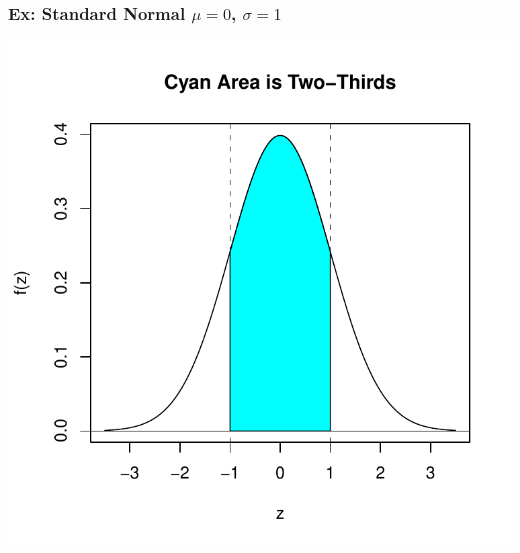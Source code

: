 \documentclass[handout]{beamer}
\begin{document}
\begin{frame}
\frametitle{Ex: Standard Normal $\mu=0$, $\sigma=1$}
\begin{center}
\includegraphics{figure/lec07-001}
\end{center}
\end{frame}
\end{document}
